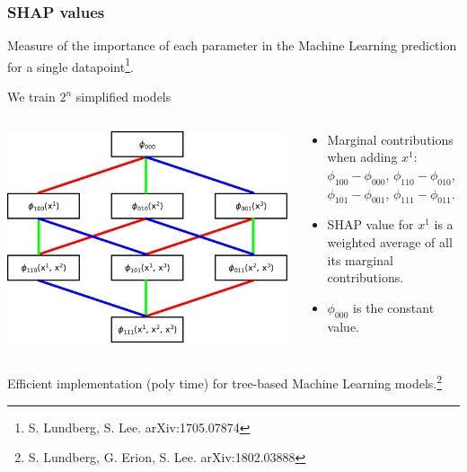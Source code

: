 \documentclass[mathserif, 10pt]{beamer}
\begin{document}
\begin{frame}
    \frametitle{SHAP values}

Measure of the importance of each parameter in the Machine Learning prediction for a single datapoint\footnote[1]{S. Lundberg, S. Lee. arXiv:1705.07874}.

    We train $2^n$ simplified models

    \begin{columns}
        \begin{column}{0.5\textwidth}
            \includegraphics[width=\columnwidth]{figures/shapgraph.png}
        \end{column}
        \begin{column}{0.5\textwidth}
            \begin{itemize}
                \item Marginal contributions {\color{red} when adding $x^1$}: $\phi_{100}-\phi_{000}$, $\phi_{110}-\phi_{010}$, $\phi_{101}-\phi_{001}$, $\phi_{111} - \phi_{011}$.
                \item SHAP value {\color{red}for $x^1$} is a weighted average of all its marginal contributions.
                \item $\phi_{000}$ is the constant value. 
            \end{itemize}
        \end{column}
    \end{columns}
    
Efficient implementation (poly time) for tree-based Machine Learning models.\footnote[2]{S. Lundberg, G. Erion, S. Lee. arXiv:1802.03888}

\end{frame}
\end{document}
